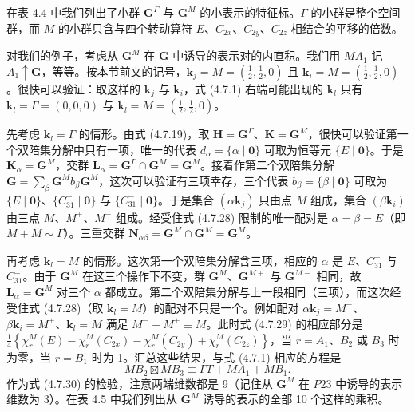 在表 4.4 中我们列出了小群 $\mathbf{G}^{\Gamma}$ 与 $\mathbf{G}^{M}$ 的小表示的特征标。$\Gamma$ 的小群是整个空间群，而 $M$ 的小群只含与四个转动算符 $E$、$C_{2x}$、$C_{2y}$、$C_{2z}$ 相结合的平移的倍数。

对我们的例子，考虑从 $\mathbf{G}^{M}$ 在 $\mathbf{G}$ 中诱导的表示对的内直积。我们用 $MA_{1}$ 记 $A_{1} \uparrow \mathbf{G}$，等等。按本节前文的记号，$\mathbf{k}_{j} = M = (\frac{1}{2}, \frac{1}{2}, 0)$ 且 $\mathbf{k}_{i} = M = (\frac{1}{2}, \frac{1}{2}, 0)$。很快可以验证：取这样的 $\mathbf{k}_{j}$ 与 $\mathbf{k}_{i}$，式 (4.7.1) 右端可能出现的 $\mathbf{k}_{l}$ 只有 $\mathbf{k}_{l} = \Gamma = (0, 0, 0)$ 与 $\mathbf{k}_{l} = M = (\frac{1}{2}, \frac{1}{2}, 0)$。

先考虑 $\mathbf{k}_{l} = \Gamma$ 的情形。由式 (4.7.19)，取 $\mathbf{H} = \mathbf{G}^{\Gamma}$、$\mathbf{K} = \mathbf{G}^{M}$，很快可以验证第一个双陪集分解中只有一项，唯一的代表 $d_{\alpha} = \{\alpha \mid \mathbf{0}\}$ 可取为恒等元 $\{E \mid \mathbf{0}\}$。于是 $\mathbf{K}_{\alpha} = \mathbf{G}^{M}$，交群 $\mathbf{L}_{\alpha} = \mathbf{G}^{\Gamma} \cap \mathbf{G}^{M} = \mathbf{G}^{M}$。接着作第二个双陪集分解 $\mathbf{G} = \sum_{\beta}\mathbf{G}^{M}b_{\beta}\mathbf{G}^{M}$，这次可以验证有三项幸存，三个代表 $b_{\beta} = \{\beta \mid \mathbf{0}\}$ 可取为 $\{E \mid \mathbf{0}\}$、$\{C^{+}_{31} \mid \mathbf{0}\}$ 与 $\{C^{-}_{31} \mid \mathbf{0}\}$。于是集合 $(\alpha\mathbf{k}_{j})$ 只由点 $M$ 组成，集合 $(\beta\mathbf{k}_{i})$ 由三点 $M$、$M^{+}$、$M^{-}$ 组成。经受住式 (4.7.28) 限制的唯一配对是 $\alpha = \beta = E$（即 $M + M \sim \Gamma$）。三重交群 $\mathbf{N}_{\alpha\beta} = \mathbf{G}^{M} \cap \mathbf{G}^{M} = \mathbf{G}^{M}$。

再考虑 $\mathbf{k}_{l} = M$ 的情形。这次第一个双陪集分解含三项，相应的 $\alpha$ 是 $E$、$C^{+}_{31}$ 与 $C^{-}_{31}$。由于 $\mathbf{G}^{M}$ 在这三个操作下不变，群 $\mathbf{G}^{M}$、$\mathbf{G}^{M+}$ 与 $\mathbf{G}^{M-}$ 相同，故 $\mathbf{L}_{\alpha} = \mathbf{G}^{M}$ 对三个 $\alpha$ 都成立。第二个双陪集分解与上一段相同（三项），而这次经受住式 (4.7.28)（取 $\mathbf{k}_{l} = M$）的配对不只是一个。例如配对 $\alpha\mathbf{k}_{j} = M^{-}$、$\beta\mathbf{k}_{i} = M^{+}$、$\mathbf{k}_{l} = M$ 满足 $M^{-} + M^{+} \equiv M$。此时式 (4.7.29) 的相应部分是 $\frac{1}{4}\left\{\chi^{M}_{r}(E) - \chi^{M}_{r}(C_{2x}) - \chi^{M}_{r}(C_{2y}) + \chi^{M}_{r}(C_{2z})\right\}$，当 $r = A_{1}$、$B_{2}$ 或 $B_{3}$ 时为零，当 $r = B_{1}$ 时为 1。汇总这些结果，与式 (4.7.1) 相应的方程是
\begin{equation*}
MB_{2} \boxtimes MB_{3} \equiv \Gamma T + MA_{1} + MB_{1}.
\tag{4.7.30}
\end{equation*}
作为式 (4.7.30) 的检验，注意两端维数都是 9（记住从 $\mathbf{G}^{M}$ 在 $P23$ 中诱导的表示维数为 3）。在表 4.5 中我们列出从 $\mathbf{G}^{M}$ 诱导的表示的全部 10 个这样的乘积。

